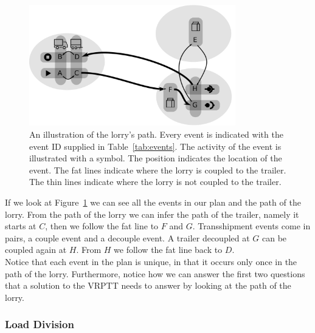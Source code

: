 \begin{figure}[!h]
  \centering
    \includegraphics[width=0.8\textwidth]{img/trivial_vertices_v2.pdf}
  \caption{An illustration of the lorry's path. Every event is indicated with the event ID supplied in Table~\ref{tab:events}. The activity of the event is illustrated with a symbol. The position indicates the location of the event. The fat lines indicate where the lorry is coupled to the trailer. The thin lines indicate where the lorry is not coupled to the trailer.}
  \label{fig:vertices}
\end{figure}



If we look at Figure~\ref{fig:vertices} we can see all the events in our plan and the path of the lorry.
From the path of the lorry we can infer the path of the trailer, namely it starts at $C$, then we follow the fat line to $ F $ and $ G$. Transshipment events come in pairs, a couple event and a decouple event. A trailer decoupled at $G$ can be coupled again at $H$.
 From $H$ we follow the fat line back to $D$. \\

Notice that each event in the plan is unique, in that it occurs only once in the path of the lorry.
Furthermore, notice how we can answer the first two questions that a solution to the VRPTT needs to answer by looking at the path of the lorry.


\subsubsection{Load Division}


